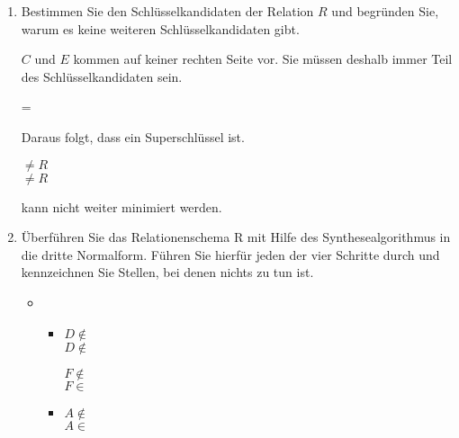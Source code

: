 \documentclass{bschlangaul-aufgabe}
\begin{document}
\begin{enumerate}
\item Bestimmen Sie den Schlüsselkandidaten der Relation $R$ und
begründen Sie, warum es keine weiteren Schlüsselkandidaten gibt.

\begin{liAntwort}
$C$ und $E$ kommen auf keiner rechten Seite vor. Sie müssen deshalb
immer Teil des Schlüsselkandidaten sein.

 = 

Daraus folgt, dass  ein Superschlüssel ist.

 $\neq R$\\
 $\neq R$

 kann nicht weiter minimiert werden.
\end{liAntwort}

\item Überführen Sie das Relationenschema R mit Hilfe des
Synthesealgorithmus in die dritte
Normalform. Führen Sie hierfür jeden der vier
Schritte durch und kennzeichnen Sie Stellen, bei denen nichts zu tun
ist.

\begin{liAntwort}
\begin{itemize}

\item {}

\begin{itemize}

\item {}


$D \notin$ \\
$D \notin$ 


$F \notin$ \\
$F \in$ 


\item {}


$A \notin$ \\
$A \in$ 


\end{itemize}
\end{itemize}
\end{liAntwort}
\end{enumerate}
\end{document}
